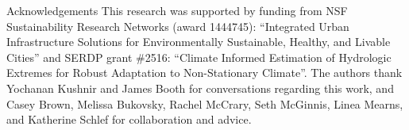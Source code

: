 \begin{block}{Acknowledgements}
  This research was supported by funding from NSF Sustainability Research Networks (award 1444745): ``Integrated Urban Infrastructure Solutions for Environmentally Sustainable, Healthy, and Livable Cities'' and  SERDP grant \#2516: ``Climate Informed Estimation of Hydrologic Extremes for Robust Adaptation to Non-Stationary Climate''.
  The authors thank Yochanan Kushnir and James Booth for conversations regarding this work, and Casey Brown, Melissa Bukovsky, Rachel McCrary, Seth McGinnis, Linea Mearns, and Katherine Schlef for collaboration and advice.
\end{block}
